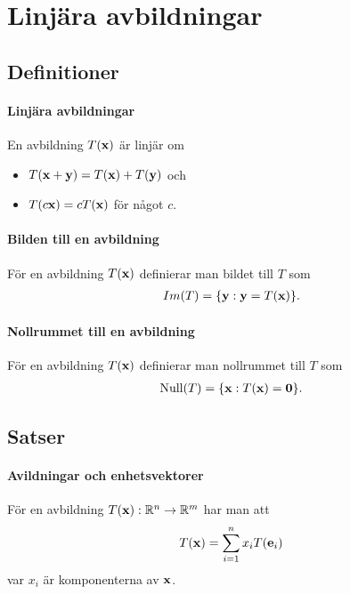 \section{Linjära avbildningar}

\subsection{Definitioner}

\paragraph{Linjära avbildningar}
En avbildning $T(\vect{x})$ är linjär om
\begin{itemize}
	\item $T(\vect{x} + \vect{y}) = T(\vect{x}) + T(\vect{y})$ och
	\item $T(c\vect{x}) = cT(\vect{x})$ för något $c$.
\end{itemize}

\paragraph{Bilden till en avbildning}
För en avbildning $T(\vect{x})$ definierar man bildet till $T$ som
\begin{align*}
	Im(T) = \{\vect{y} : \vect{y} = T(\vect{x})\}.
\end{align*}

\paragraph{Nollrummet till en avbildning}
För en avbildning $T(\vect{x})$ definierar man nollrummet till $T$ som
\begin{align*}
	\text{Null}(T) = \{\vect{x} : T(\vect{x})= \vect{0}\}.
\end{align*}

\subsection{Satser}

\paragraph{Avildningar och enhetsvektorer}
För en avbildning $T(\vect{x}): \R^n\to\R^m$ har man att
\begin{align*}
	T(\vect{x}) = \sum\limits_{i = 1}^{n} x_iT(\vect{e}_i)
\end{align*}
var $x_i$ är komponenterna av $\vect{x}$.

